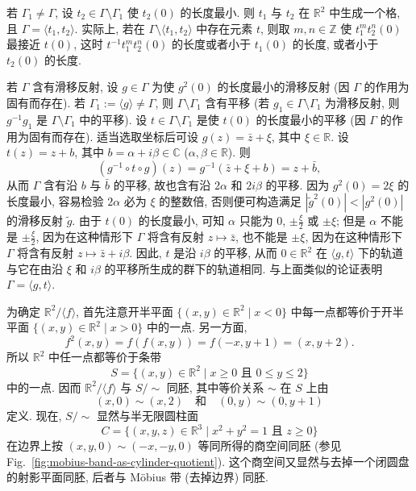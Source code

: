 \begin{description}[font=\normalfont,leftmargin=2em,labelwidth=1.5em]
\begin{enumerate}[label=(\alph*),ref=\alph*,leftmargin=*]
若 $\Gamma_1\ne\Gamma$, 设 $t_2\in\Gamma\setminus\Gamma_1$ 使 $t_2(0)$ 的长度最小. 则 $t_1$ 与 $t_2$ 在 $\mathbb{R}^2$ 中生成一个格, 且 $\Gamma=\langle t_1,t_2\rangle$. 实际上, 若在 $\Gamma\setminus\langle t_1,t_2\rangle$ 中存在元素 $t$, 则取 $m,n\in\mathbb{Z}$ 使 $t_1^m t_2^n(0)$ 最接近 $t(0)$, 这时 $t^{-1}t_1^m t_2^n(0)$ 的长度或者小于 $t_1(0)$ 的长度, 或者小于 $t_2(0)$ 的长度.

若 $\Gamma$ 含有滑移反射, 设 $g\in\Gamma$ 为使 $g^2(0)$ 的长度最小的滑移反射 (因 $\Gamma$ 的作用为固有而存在). 若 $\Gamma_1:=\langle g\rangle\ne\Gamma$, 则 $\Gamma\setminus\Gamma_1$ 含有平移 (若 $g_1\in\Gamma\setminus\Gamma_1$ 为滑移反射, 则 $g^{-1}g_1$ 是 $\Gamma\setminus\Gamma_1$ 中的平移). 设 $t\in\Gamma\setminus\Gamma_1$ 是使 $t(0)$ 的长度最小的平移 (因 $\Gamma$ 的作用为固有而存在). 适当选取坐标后可设 $g(z)=\bar z+\xi$, 其中 $\xi\in\mathbb{R}$. 设 $t(z)=z+b$, 其中 $b=\alpha+i\beta\in\mathbb{C}$ ($\alpha,\beta\in\mathbb{R}$). 则
\[
  (g^{-1}\circ t\circ g)(z)=g^{-1}(\bar z+\xi+b)=z+\bar b,
\]
从而 $\Gamma$ 含有沿 $b$ 与 $\bar b$ 的平移, 故也含有沿 $2\alpha$ 和 $2i\beta$ 的平移. 因为 $g^2(0)=2\xi$ 的长度最小, 容易检验 $2\alpha$ 必为 $\xi$ 的整数倍, 否则便可构造满足 $|\widetilde g^2(0)|<|g^2(0)|$ 的滑移反射 $\widetilde g$. 由于 $t(0)$ 的长度最小, 可知 $\alpha$ 只能为 $0$, $\pm\frac{\xi}{2}$ 或 $\pm\xi$; 但是 $\alpha$ 不能是 $\pm\frac{\xi}{2}$, 因为在这种情形下 $\Gamma$ 将含有反射 $z\mapsto\bar z$, 也不能是 $\pm\xi$, 因为在这种情形下 $\Gamma$ 将含有反射 $z\mapsto\bar z+i\beta$. 因此, $t$ 是沿 $i\beta$ 的平移, 从而 $0\in\mathbb{R}^2$ 在 $\langle g,t\rangle$ 下的轨道与它在由沿 $\xi$ 和 $i\beta$ 的平移所生成的群下的轨道相同. 与上面类似的论证表明 $\Gamma=\langle g,t\rangle$.
\end{enumerate}

为确定 $\mathbb{R}^2/\langle f\rangle$, 首先注意开半平面 $\{(x,y)\in\mathbb{R}^2\mid x<0\}$ 中每一点都等价于开半平面 $\{(x,y)\in\mathbb{R}^2\mid x>0\}$ 中的一点. 另一方面,
\[
  f^2(x,y)=f(f(x,y))=f(-x,y+1)=(x,y+2).
\]
所以 $\mathbb{R}^2$ 中任一点都等价于条带
\[
  S=\{(x,y)\in\mathbb{R}^2\mid x\ge0\text{ 且 }0\le y\le2\}
\]
中的一点. 因而 $\mathbb{R}^2/\langle f\rangle$ 与 $S/{\sim}$ 同胚, 其中等价关系 $\sim$ 在 $S$ 上由
\[
  (x,0)\sim(x,2)\quad\text{和}\quad(0,y)\sim(0,y+1)
\]
定义. 现在, $S/{\sim}$ 显然与半无限圆柱面
\[
  C=\{(x,y,z)\in\mathbb{R}^3\mid x^2+y^2=1\text{ 且 }z\ge0\}
\]
在边界上按 $(x,y,0)\sim(-x,-y,0)$ 等同所得的商空间同胚 (参见 Fig.~\ref{fig:mobius-band-as-cylinder-quotient}). 这个商空间又显然与去掉一个闭圆盘的射影平面同胚, 后者与 Möbius 带 (去掉边界) 同胚.


\end{description}
